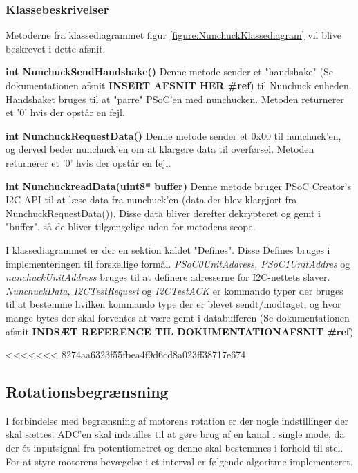 \subsubsection{Klassebeskrivelser}
Metoderne fra klassediagrammet figur \ref{figure:NunchuckKlassediagram} vil blive beskrevet i dette afsnit.

\noindent\textbf{int NunchuckSendHandshake()}\newline
Denne metode sender et "handshake" (Se dokumentationen afsnit \textbf{INSERT AFSNIT HER \#ref}) til Nunchuck enheden. Handshaket bruges til at "parre" PSoC'en med nunchucken. Metoden returnerer et '0' hvis der opstår en fejl. \newline

\noindent\textbf{int NunchuckRequestData()}\newline
Denne metode sender et 0x00 til nunchuck'en, og derved beder nunchuck'en om at klargøre data til overførsel. Metoden returnerer et '0' hvis der opstår en fejl. \newline

\noindent\textbf{int NunchuckreadData(uint8* buffer)}\newline
Denne metode bruger PSoC Creator's I2C-API til at læse data fra nunchuck'en (data der blev klargjort fra NunchuckRequestData()). Disse data bliver derefter dekrypteret og gemt i "buffer", så de bliver tilgængelige uden for metodens scope. \newline

I klassediagrammet er der en sektion kaldet "Defines". Disse Defines bruges i implementeringen til forskellige formål. \textit{PSoC0UnitAddress, PSoC1UnitAddres} og \textit{nunchuckUnitAddress} bruges til at definere adresserne for I2C-nettets slaver. \textit{NunchuckData, I2CTestRequest} og \textit{I2CTestACK} er kommando typer der bruges til at bestemme hvilken kommando type der er blevet sendt/modtaget, og hvor mange bytes der skal forventes at være gemt i databufferen (Se dokumentationen afsnit \textbf{INDSÆT REFERENCE TIL DOKUMENTATIONAFSNIT \#ref}) 

<<<<<<< 8274aa6323f55fbea4f9d6cd8a023ff38717e674
\subsection{Rotationsbegrænsning}
I forbindelse med begrænsning af motorens rotation er der nogle indstillinger der skal sættes. ADC'en skal indstilles til at gøre brug af en kanal i single mode, da der ét inputsignal fra potentiometret og denne skal bestemmes i forhold til stel. For at styre motorens bevægelse i et interval er følgende algoritme implementeret.

